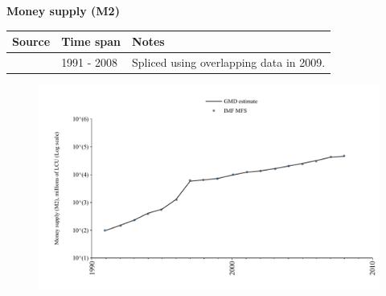 \documentclass[12pt,a4paper,landscape]{article}
\begin{document}
\begin{adjustbox}{max totalsize={\paperwidth}{\paperheight},center}
\begin{minipage}[t][\textheight][t]{\textwidth}
\vspace*{0.5cm}
{}
\begin{center}
{\Large\bfseries Money supply (M2)}
\end{center}
\vspace{0.5cm}
\begin{table}[H]
\centering
\small
\begin{tabular}{|l|l|l|}
\hline
\textbf{Source} & \textbf{Time span} & \textbf{Notes} \\
\hline
\rowcolor{white}\cite{IMF_MFS}& 1991 - 2008 &Spliced using overlapping data in 2009. \\
\hline
\end{tabular}
\end{table}
\begin{figure}[H]
\centering
\includegraphics[width=\textwidth,height=0.6\textheight,keepaspectratio]{graphs/BGR_M2.pdf}
\end{figure}
\end{minipage}
\end{adjustbox}
\end{document}
